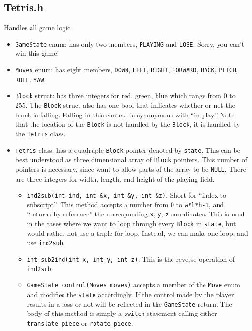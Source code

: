 \documentclass[letterpaper, 12pt]{article}
\begin{document}
\subsection{Tetris.h}
Handles all game logic
\begin{itemize}
    \item \verb|GameState| enum: has only two members, \verb|PLAYING| and \verb|LOSE|. Sorry, you can't win this game!
    \item \verb|Moves| enum: has eight members, \verb|DOWN|, \verb|LEFT|, \verb|RIGHT|, \verb|FORWARD|, \verb|BACK|, \verb|PITCH|, \verb|ROLL|, \verb|YAW|.
    \item \verb|Block| struct: has three integers for red, green, blue which range from 0 to 255.
        The \verb|Block| struct also has one bool that indicates whether or not the block is falling.
        Falling in this context is synonymous with ``in play.''
        Note that the location of the \verb|Block| is not handled by the \verb|Block|, it is handled by the \verb|Tetris| class.
    \item \verb|Tetris| class: has a quadruple \verb|Block| pointer denoted by \verb|state|.
        This can be best understood as three dimensional array of \verb|Block| pointers.
        This number of pointers is necessary, since want to allow parts of the array to be \verb|NULL|.
        There are three integers for width, length, and height of the playing field.
        \begin{itemize}
            \item \verb|ind2sub(int ind, int &x, int &y, int &z)|. Short for ``index to subscript''.
                This method accepts a number from 0 to \verb|w*l*h-1|, and ``returns by reference'' the corresponding \verb|x|, \verb|y|, \verb|z| coordinates.
                This is used in the cases where we want to loop through every \verb|Block| in \verb|state|, but would rather not use a triple for loop.
                Instead, we can make one loop, and use \verb|ind2sub|.
            \item \verb|int sub2ind(int x, int y, int z)|: This is the reverse operation of \verb|ind2sub|.
            \item \verb|GameState control(Moves moves)| accepts a member of the \verb|Move| enum and modifies the \verb|state| accordingly.
                If the control made by the player results in a loss or not will be reflected in the \verb|GameState| return.
                The body of this method is simply a \verb|switch| statement calling either \verb|translate_piece| or \verb|rotate_piece|.

\end{itemize}
\end{itemize}
\end{document}

